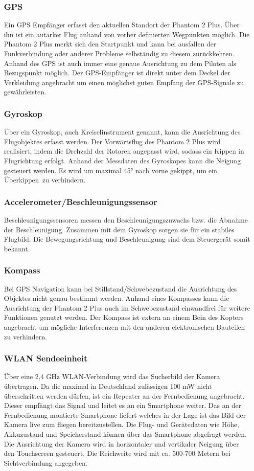 \subsubsection*{\ac{GPS}}
Ein \ac{GPS} Empfänger erfasst den aktuellen Standort der Phantom 2 Plus. Über ihn ist ein autarker Flug anhand von vorher definierten Wegpunkten möglich. Die Phantom 2 Plus merkt sich den Startpunkt und kann bei ausfallen der Funkverbindung oder anderer Probleme selbständig zu diesem zurückkehren. Anhand des \ac{GPS} ist auch immer eine genaue Ausrichtung zu dem Piloten als Bezugspunkt möglich. Der \ac{GPS}-Empfänger ist direkt unter dem Deckel der Verkleidung angebracht um einen möglichst guten Empfang der \ac{GPS}-Signale zu gewährleisten.
\subsubsection*{Gyroskop}
Über ein Gyroskop, auch Kreiselinstrument genannt, kann die Ausrichtung des Flugobjektes erfasst werden. Der Vorwärtsflug des Phantom 2 Plus wird realisiert, indem die Drehzahl der Rotoren angepasst wird, sodass ein Kippen in Flugrichtung erfolgt. Anhand der Messdaten des Gyroskopes kann die Neigung gesteuert werden. Es wird um maximal 45° nach vorne gekippt, um ein \glqq Überkippen\grqq\ zu verhindern.\\
\subsubsection*{Accelerometer/Beschleunigungssensor}
Beschleunigungssensoren messen den Beschleunigungszuwachs bzw. die Abnahme der Beschleunigung. Zusammen mit dem Gyroskop sorgen sie für ein stabiles Flugbild. Die Bewegungsrichtung und Beschleunigung sind dem Steuergerät somit bekannt\cite{beschleunigung}.
\subsubsection*{Kompass}
Bei \ac{GPS} Navigation kann bei Stillstand/Schwebezustand die Ausrichtung des Objektes nicht genau bestimmt werden. Anhand eines Kompasses kann die Ausrichtung der Phantom 2 Plus auch im Schwebezustand einwandfrei für weitere Funktionen genutzt werden. Der Kompass ist extern an einem Bein des Kopters angebracht um mögliche Interferenzen mit den anderen elektronischen Bauteilen zu verhindern.\\
\subsubsection*{WLAN Sendeeinheit}
Über eine 2,4 GHz WLAN-Verbindung wird das Sucherbild der Kamera übertragen. Da die maximal in Deutschland zulässigen 100 mW nicht überschritten werden dürfen, ist ein Repeater an der Fernbedienung angebracht. Dieser empfängt das Signal und leitet es an ein Smartphone weiter. Das an der Fernbedienung montierte Smartphone liefert welches in der Lage ist das Bild der Kamera live zum fliegen bereitzustellen. Die Flug- und Gerätedaten wie Höhe, Akkuzustand und Speicherstand können über das Smartphone abgefragt werden. Die Ausrichtung der Kamera wird in horizontaler und vertikaler Neigung über den Touchscreen gesteuert. Die Reichweite wird mit ca. 500-700 Metern bei Sichtverbindung angegeben.

